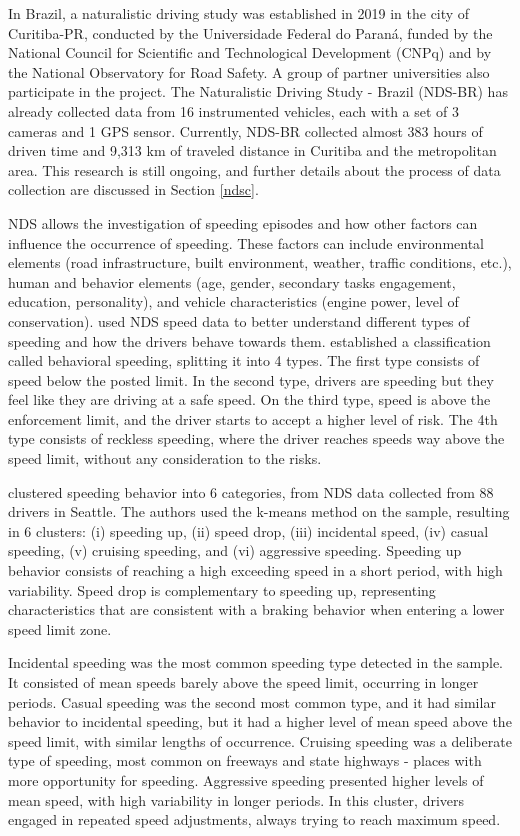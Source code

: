 In Brazil, a naturalistic driving study was established in 2019 in the city of Curitiba-PR, conducted by the Universidade Federal do Paraná, funded by the National Council for Scientific and Technological Development (CNPq) and by the National Observatory for Road Safety. A group of partner universities also participate in the project. The Naturalistic Driving Study - Brazil (NDS-BR) has already collected data from 16 instrumented vehicles, each with a set of 3 cameras and 1 GPS sensor. Currently, NDS-BR collected almost 383 hours of driven time and 9,313 km of traveled distance in Curitiba and the metropolitan area. This research is still ongoing, and further details about the process of data collection are discussed in Section \ref{ndsc}.

NDS allows the investigation of speeding episodes and how other factors can influence the occurrence of speeding. These factors can include environmental elements (road infrastructure, built environment, weather, traffic conditions, etc.), human and behavior elements (age, gender, secondary tasks engagement, education, personality),  and vehicle characteristics (engine power, level of conservation). \textcite{Richard2013,Richard2017, Richard2020} used NDS speed data to better understand different types of speeding and how the drivers behave towards them. \textcite{Richard2013} established a classification called behavioral speeding, splitting it into 4 types. The first type consists of speed below the posted limit. In the second type, drivers are speeding but they feel like they are driving at a safe speed. On the third type, speed is above the enforcement limit, and the driver starts to accept a higher level of risk. The 4th type consists of reckless speeding, where the driver reaches speeds way above the speed limit, without any consideration to the risks. 

\textcite{Richard2017} clustered speeding behavior into 6 categories, from NDS data collected from 88 drivers in Seattle. The authors used the k-means method on the sample, resulting in 6 clusters: (i) speeding up, (ii) speed drop, (iii) incidental speed, (iv) casual speeding, (v) cruising speeding, and (vi) aggressive speeding. Speeding up behavior consists of reaching a high exceeding speed in a short period, with high variability. Speed drop is complementary to speeding up, representing characteristics that are consistent with a braking behavior when entering a lower speed limit zone. 

Incidental speeding was the most common speeding type detected in the sample. It consisted of mean speeds barely above the speed limit, occurring in longer periods. Casual speeding was the second most common type, and it had similar behavior to incidental speeding, but it had a higher level of mean speed above the speed limit, with similar lengths of occurrence. Cruising speeding was a deliberate type of speeding, most common on freeways and state highways - places with more opportunity for speeding. Aggressive speeding presented higher levels of mean speed, with high variability in longer periods. In this cluster, drivers engaged in repeated speed adjustments, always trying to reach maximum speed.

